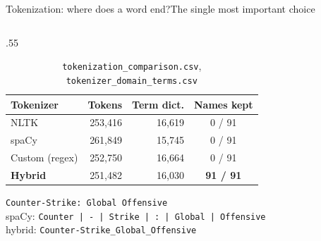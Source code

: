 \documentclass[
  aspectratio=169,
  10pt,
  t,
]{beamer}
\newcommand{\muted}[1]{\textcolor{muted}{#1}}
\begin{document}
\begin{frame}{Tokenization: where does a word end?}{The single most important choice}
\begin{columns}[T]
\begin{column}{.55\textwidth}
\begin{table}
\small
\begin{tabular}{lrrc}
\toprule
Tokenizer & Tokens & Term dict. & Names kept \\
\midrule
NLTK   & 253,416 & 16,619 & 0 / 91 \\
spaCy  & 261,849 & 15,745 & 0 / 91 \\
Custom (regex) & 252,750 & 16,664 & 0 / 91 \\
\textbf{Hybrid} & 251,482 & 16,030 & \alert{\textbf{91 / 91}} \\
\bottomrule
\end{tabular}
\caption{\texttt{tokenization\_comparison.csv}, \texttt{tokenizer\_domain\_terms.csv}}
\end{table}
\small
\texttt{Counter-Strike: Global Offensive}\\
\muted{spaCy:} \texttt{Counter | - | Strike | : | Global | Offensive}\\
\muted{hybrid:} \texttt{Counter-Strike\_Global\_Offensive}
\end{column}
\end{columns}
\end{frame}
\end{document}
